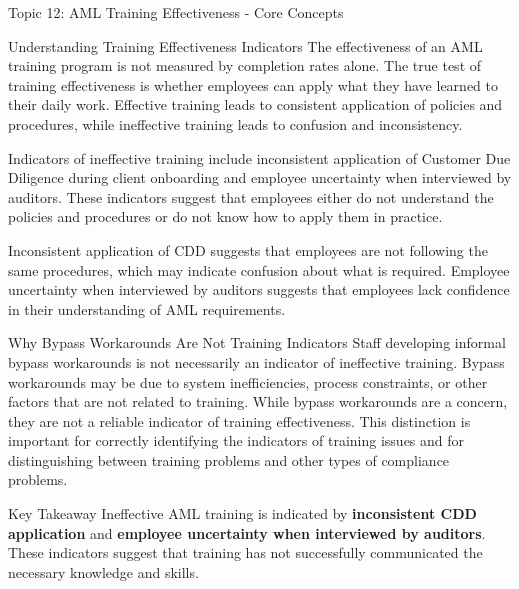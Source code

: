\documentclass[5pt]{beamer}
\begin{document}
	\begin{frame}{Topic 12: AML Training Effectiveness - Core Concepts}
		\begin{block}{\tiny Understanding Training Effectiveness Indicators}
			\tiny The effectiveness of an AML training program is not measured by completion rates alone. The true test of training effectiveness is whether employees can apply what they have learned to their daily work. Effective training leads to consistent application of policies and procedures, while ineffective training leads to confusion and inconsistency.
			
			Indicators of ineffective training include inconsistent application of Customer Due Diligence during client onboarding and employee uncertainty when interviewed by auditors. These indicators suggest that employees either do not understand the policies and procedures or do not know how to apply them in practice.
			
			Inconsistent application of CDD suggests that employees are not following the same procedures, which may indicate confusion about what is required. Employee uncertainty when interviewed by auditors suggests that employees lack confidence in their understanding of AML requirements.
		\end{block}
		
		\begin{block}{\tiny Why Bypass Workarounds Are Not Training Indicators}
			\tiny Staff developing informal bypass workarounds is not necessarily an indicator of ineffective training. Bypass workarounds may be due to system inefficiencies, process constraints, or other factors that are not related to training. While bypass workarounds are a concern, they are not a reliable indicator of training effectiveness. This distinction is important for correctly identifying the indicators of training issues and for distinguishing between training problems and other types of compliance problems.
		\end{block}
		
		\begin{alertblock}{Key Takeaway}
			\tiny Ineffective AML training is indicated by \textbf{inconsistent CDD application} and \textbf{employee uncertainty when interviewed by auditors}. These indicators suggest that training has not successfully communicated the necessary knowledge and skills.
		\end{alertblock}
	\end{frame}
	
\end{document}
